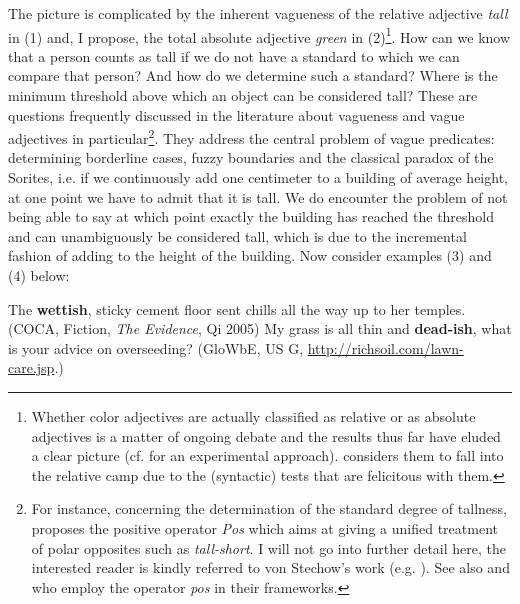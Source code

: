 \documentclass[output=paper]{langsci/langscibook}
\begin{document}
The picture is complicated by the inherent vagueness of the relative adjective  \textit{tall} in (1) and, I propose, the total absolute adjective  \textit{green} in (2)\footnote{Whether color adjectives are actually classified as relative or as absolute adjectives is a matter of ongoing debate and the results thus far have eluded a clear picture (cf. \citealt{Hansen2017} for an experimental approach). \citet{Burnett2012a, Burnett2012b} considers them to fall into the relative camp due to the (syntactic) tests that are felicitous with them.}. How can we know that a person counts as tall if we do not have a standard to which we can compare that person? And how do we determine such a standard? Where is the minimum threshold above which an object can be considered tall? These are questions frequently discussed in the literature about vagueness and vague adjectives in particular\footnote{For instance, concerning the determination of the standard degree of tallness, \citet {vonStechow1984} proposes the positive operator \textit{Pos} which aims at giving a unified treatment of polar opposites such as \textit{tall-short}. I will not go into further detail here, the interested reader is kindly referred to von Stechow's work (e.g. \citeyear{vonStechow1984,vonStechow2009}). See also \citet*{Kennedy2005} and \citet{Kennedy2007} who employ the operator \textit{pos} in their frameworks.}. They address the central problem of vague predicates: determining borderline cases, fuzzy boundaries and the classical paradox of the Sorites, i.e. if we continuously add one centimeter to a building of average height, at one point we have to admit that it is tall. We do encounter the problem of not being able to say at which point exactly the building has reached the threshold and can unambiguously be considered tall, which is due to the incremental fashion of adding to the height of the building.
Now consider examples (3) and (4) below:

\ea
	The \textbf{wettish}, sticky cement floor sent chills all the way up to her temples. (COCA, Fiction,  \textit{The Evidence}, Qi 2005)
\z
\ea
	My grass is all thin and \textbf{dead-ish}, what is your advice on overseeding? (GloWbE, US G, \url{http://richsoil.com/lawn-care.jsp}.)
\z
\end{document}
